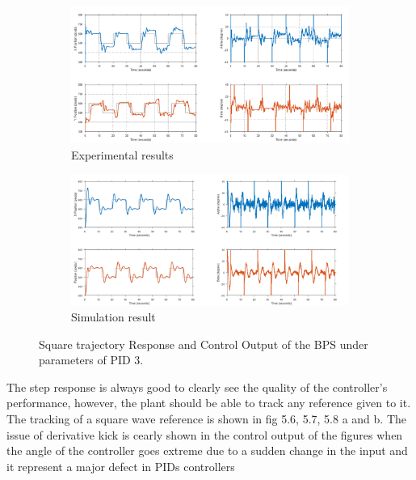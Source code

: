 \begin{figure}[h]
     \centering
     \begin{subfigure}[b]{1\textwidth}
         \centering
         \includegraphics[width=\textwidth]{Figures/chapter05/square_tracking_PID3_Expiremental.png}
         \caption{Experimental results}
         \label{fig:y equals x}
     \end{subfigure}
     \hfill
     \begin{subfigure}[b]{1\textwidth}
         \centering
         \includegraphics[width=\textwidth]{Figures/chapter05/square_tracking_PID3_simulation.png}
         \caption{Simulation result}
         \label{fig:three sin x}
     \end{subfigure}
        \caption{Square trajectory Response and Control Output of the  BPS under parameters of PID 3.}
        \label{fig:three graphs}
\end{figure}
The step response is always good to clearly see the quality of the controller’s performance, however, the plant should be able to track any reference given to it. The tracking of a square wave reference is shown in fig 5.6, 5.7, 5.8 a and b.
The issue of derivative kick is cearly shown in the control output of the figures when the angle of the controller goes extreme due to a sudden change in the input and it represent a major defect in PIDs controllers




